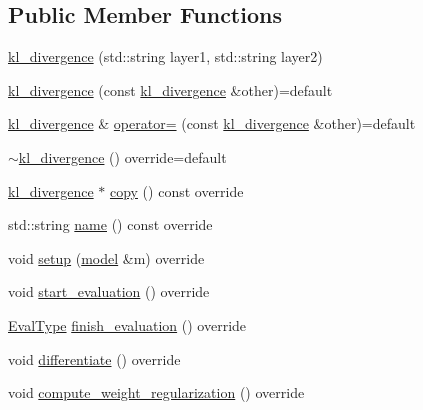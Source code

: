 \subsection*{Public Member Functions}
\begin{DoxyCompactItemize}
\item 
\hyperlink{classlbann_1_1kl__divergence_a3084d98e61853086a207a3893421e4d9}{kl\+\_\+divergence} (std\+::string layer1, std\+::string layer2)
\item 
\hyperlink{classlbann_1_1kl__divergence_a2262db9ab3c5383033d9e893bb4c7edd}{kl\+\_\+divergence} (const \hyperlink{classlbann_1_1kl__divergence}{kl\+\_\+divergence} \&other)=default
\item 
\hyperlink{classlbann_1_1kl__divergence}{kl\+\_\+divergence} \& \hyperlink{classlbann_1_1kl__divergence_ac70fa0c7c0f1d97402a1ca73c0dfb927}{operator=} (const \hyperlink{classlbann_1_1kl__divergence}{kl\+\_\+divergence} \&other)=default
\item 
\hyperlink{classlbann_1_1kl__divergence_ad256b4593f170d9dfa5b17ca9a8ac0cc}{$\sim$kl\+\_\+divergence} () override=default
\item 
\hyperlink{classlbann_1_1kl__divergence}{kl\+\_\+divergence} $\ast$ \hyperlink{classlbann_1_1kl__divergence_aa0265eb9f1cff77d4101137b09f87353}{copy} () const override
\item 
std\+::string \hyperlink{classlbann_1_1kl__divergence_a42f016a75f640cb4ec9ceb9320da4a47}{name} () const override
\item 
void \hyperlink{classlbann_1_1kl__divergence_acaa96d2e2fcf164c2e7b5cd5a0bf222e}{setup} (\hyperlink{classlbann_1_1model}{model} \&m) override
\item 
void \hyperlink{classlbann_1_1kl__divergence_a0a77c724ff9b918e2c2eaf3944f50ac5}{start\+\_\+evaluation} () override
\item 
\hyperlink{base_8hpp_a3266f5ac18504bbadea983c109566867}{Eval\+Type} \hyperlink{classlbann_1_1kl__divergence_a93aab2ca89cdaab075a940184ae209d5}{finish\+\_\+evaluation} () override
\item 
void \hyperlink{classlbann_1_1kl__divergence_aeb39d1ba1e74874cbf396fbe137ff601}{differentiate} () override
\item 
void \hyperlink{classlbann_1_1kl__divergence_a6f9e18587348fa8dc6871c404232f121}{compute\+\_\+weight\+\_\+regularization} () override
\end{DoxyCompactItemize}
